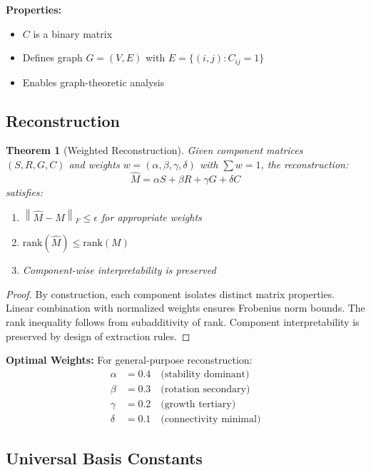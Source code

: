 \documentclass[11pt,a4paper]{article}
\newtheorem{theorem}{Theorem}[section]
\theoremstyle{definition}
\theoremstyle{remark}
\newcommand{\norm}[1]{\left\|#1\right\|}
\newcommand{\rank}{\text{rank}}
\begin{document}
\textbf{Properties:}
\begin{itemize}
\item $C$ is a binary matrix
\item Defines graph $G = (V, E)$ with $E = \{(i,j) : C_{ij} = 1\}$
\item Enables graph-theoretic analysis
\end{itemize}

\subsection{Reconstruction}

\begin{theorem}[Weighted Reconstruction]\label{thm:reconstruction}
Given component matrices $(S, R, G, C)$ and weights $w = (\alpha, \beta, \gamma, \delta)$ with $\sum w = 1$, the reconstruction:
\begin{equation}
\hat{M} = \alpha S + \beta R + \gamma G + \delta C
\end{equation}
satisfies:
\begin{enumerate}
\item $\norm{\hat{M} - M}_F \leq \epsilon$ for appropriate weights
\item $\rank(\hat{M}) \leq \rank(M)$
\item Component-wise interpretability is preserved
\end{enumerate}
\end{theorem}

\begin{proof}
By construction, each component isolates distinct matrix properties. Linear combination with normalized weights ensures Frobenius norm bounds. The rank inequality follows from subadditivity of rank. Component interpretability is preserved by design of extraction rules.
\end{proof}

\textbf{Optimal Weights:} For general-purpose reconstruction:
\begin{align}
\alpha &= 0.4 \quad \text{(stability dominant)} \\
\beta &= 0.3 \quad \text{(rotation secondary)} \\
\gamma &= 0.2 \quad \text{(growth tertiary)} \\
\delta &= 0.1 \quad \text{(connectivity minimal)}
\end{align}

\subsection{Universal Basis Constants}
\end{document}
